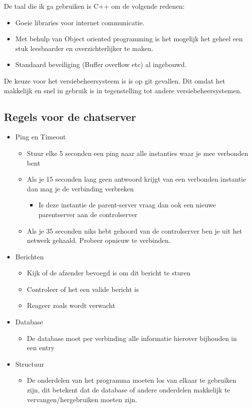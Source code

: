 \documentclass{article}
\begin{document}
De taal die ik ga gebruiken is C++ om de volgende redenen:
\begin{itemize}
\item Goeie libraries voor internet communicatie.
\item Met behulp van Object oriented programming is het mogelijk het geheel een stuk leesbaarder en overzichterlijker te maken.
\item Standaard beveiliging (Buffer overflow etc) al ingebouwd.
\end{itemize}
De keuze voor het versiebeheersysteem is is op git gevallen. Dit omdat het makkelijk en snel in gebruik is in tegenstelling tot andere versiebeheersystemen.
\newline
\subsection{Regels voor de chatserver}
\begin{itemize}
\item Ping en Timeout
\begin{itemize}
\item Stuur elke 5 seconden een ping naar alle instanties waar je mee verbonden bent
\item Als je 15 seconden lang geen antwoord krijgt van een verbonden instantie dan mag je de verbinding verbreken
\begin{itemize}
\item Is deze instantie de parent-server vraag dan ook een nieuwe parentserver aan de controlserver
\end{itemize}
\item Als je 35 seconden niks hebt gehoord van de controlserver ben je uit het netwerk gehaald. Probeer opnieuw te verbinden.
\end{itemize}
\item Berichten
\begin{itemize}
\item Kijk of de afzender bevoegd is om dit bericht te sturen
\item Controleer of het een valide bericht is
\item Reageer zoals wordt verwacht
\end{itemize}
\item Database
\begin{itemize}
\item De database moet per verbinding alle informatie hierover bijhouden in een entry
\end{itemize}
\item Structuur
\begin{itemize}
\item De onderdelen van het programma moeten los van elkaar te gebruiken zijn, dit betekent dat de database of andere onderdelen makkelijk te vervangen/hergebruiken moeten zijn.
\end{itemize}
\end{itemize}
\end{document}
